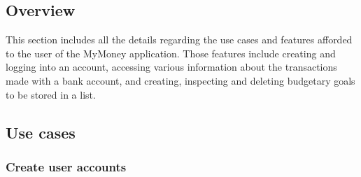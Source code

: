 \documentclass[letterpaper]{article}
\begin{document}
	\subsection{Overview}
	
		This section includes all the details regarding the use cases and features afforded to the user of the MyMoney application. Those features include creating and logging into an account, accessing various information about the transactions made with a bank account, and creating, inspecting and deleting budgetary goals to be stored in a list.
	
	\subsection{Use cases}
	
		\subsubsection{Create user accounts}
		
\end{document}
